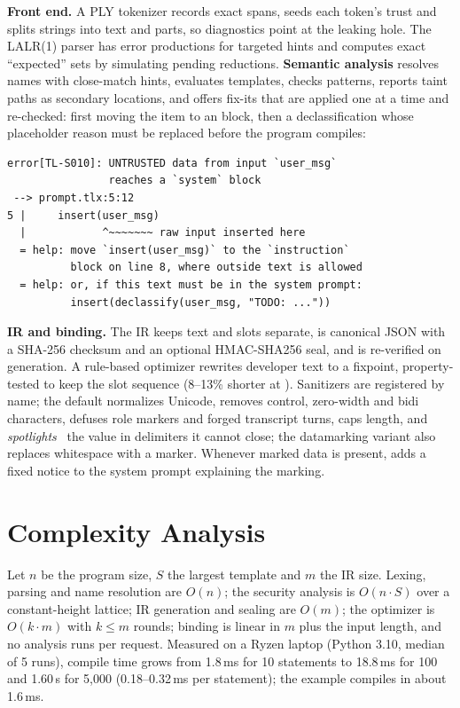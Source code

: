 \documentclass[conference]{IEEEtran}
\begin{document}
\textbf{Front end.} A PLY tokenizer records exact spans, seeds each token's trust and splits strings into text and  parts, so diagnostics point at the leaking hole. The LALR(1) parser has error productions for targeted hints and computes exact ``expected'' sets by simulating pending reductions. \textbf{Semantic analysis} resolves names with close-match hints, evaluates templates, checks patterns, reports taint paths as secondary locations, and offers fix-its that are applied one at a time and re-checked: first moving the item to an  block, then a declassification whose placeholder reason must be replaced before the program compiles:
\begin{lstlisting}[language={},basicstyle=\ttfamily\scriptsize]
error[TL-S010]: UNTRUSTED data from input `user_msg`
                reaches a `system` block
 --> prompt.tlx:5:12
5 |     insert(user_msg)
  |            ^~~~~~~~ raw input inserted here
  = help: move `insert(user_msg)` to the `instruction`
          block on line 8, where outside text is allowed
  = help: or, if this text must be in the system prompt:
          insert(declassify(user_msg, "TODO: ..."))
\end{lstlisting}
\textbf{IR and binding.} The IR keeps text and slots separate, is canonical JSON with a SHA-256 checksum and an optional HMAC-SHA256 seal, and is re-verified on generation. A rule-based optimizer rewrites developer text to a fixpoint, property-tested to keep the slot sequence (8--13\% shorter at ). Sanitizers are registered by name; the default normalizes Unicode, removes control, zero-width and bidi characters, defuses role markers and forged transcript turns, caps length, and \emph{spotlights}~\cite{hines2024spotlighting} the value in  delimiters it cannot close; the datamarking variant also replaces whitespace with a marker. Whenever marked data is present,  adds a fixed notice to the system prompt explaining the marking.

\section{Complexity Analysis}\label{sec:complexity}

Let $n$ be the program size, $S$ the largest template and $m$ the IR size. Lexing, parsing and name resolution are $O(n)$; the security analysis is $O(n\cdot S)$ over a constant-height lattice; IR generation and sealing are $O(m)$; the optimizer is $O(k\cdot m)$ with $k \le m$ rounds; binding is linear in $m$ plus the input length, and no analysis runs per request. Measured on a Ryzen laptop (Python 3.10, median of 5 runs), compile time grows from 1.8\,ms for 10 statements to 18.8\,ms for 100 and 1.60\,s for 5{,}000 (0.18--0.32\,ms per statement); the example compiles in about 1.6\,ms.
\end{document}
